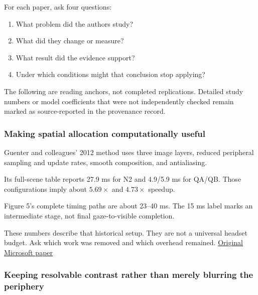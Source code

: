 \hypertarget{04-visual-computing-ii-ch042-read-research-as-a-chain-of-questions-methods-and-bounded-conclusions}{}

For each paper, ask four questions:

\begin{enumerate}
\def\labelenumi{\arabic{enumi}.}
\tightlist
\item
  What problem did the authors study?
\item
  What did they change or measure?
\item
  What result did the evidence support?
\item
  Under which conditions might that conclusion stop applying?
\end{enumerate}

The following are reading anchors, not completed replications. Detailed study numbers or model coefficients that were not independently checked remain marked as source-reported in the provenance record.

\subsubsection{Making spatial allocation computationally useful}\label{04-visual-computing-ii-ch042-making-spatial-allocation-computationally-useful}

\hypertarget{04-visual-computing-ii-ch042-making-spatial-allocation-computationally-useful}{}

Guenter and colleagues' 2012 method uses three image layers, reduced peripheral sampling and update rates, smooth composition, and antialiasing.

Its full-scene table reports 27.9 ms for N2 and 4.9/5.9 ms for QA/QB. Those configurations imply about \(5.69\times\) and \(4.73\times\) speedup.

Figure 5's complete timing paths are about 23--40 ms. The 15 ms label marks an intermediate stage, not final gaze-to-visible completion.

These numbers describe that historical setup. They are not a universal headset budget. Ask which work was removed and which overhead remained. \href{https://www.microsoft.com/en-us/research/wp-content/uploads/2012/11/foveated_final15.pdf}{Original Microsoft paper}

\subsubsection{Keeping resolvable contrast rather than merely blurring the periphery}\label{04-visual-computing-ii-ch042-keeping-resolvable-contrast-rather-than-merely-blurring-the-periphery}

